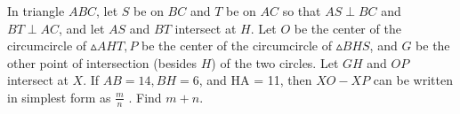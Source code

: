 In triangle $ABC$, let $S$ be on $BC$ and $T$ be on $AC$ so that $AS  \perp BC$ and $BT \perp AC$, and let $AS$ and $BT$ intersect at $H$. Let $O$ be the center of the circumcircle of $\vartriangle AHT, P$ be the center of the circumcircle of $\vartriangle BHS$, and $G$ be the other point of intersection (besides $H$) of the two circles. Let $GH$ and $OP$ intersect at $X$. If $AB = 14, BH = 6$, and HA = 11, then $XO - XP$ can be written in simplest form as $\frac{m}{n}$ . Find $m + n$.